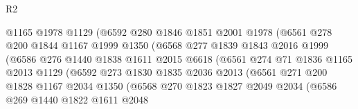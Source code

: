 \begin{lexlean}{R2}
\begin{coremodule}
                            @1165
                            @1978
                            @1129
                            (@6592
                              @280
                              @1846
                              @1851
                              @2001
                              @1978
                              (@6561
                                @278
                                @200
                                @1844
                                @1167
                                @1999
                                @1350
                                (@6568
                                  @277
                                  @1839
                                  @1843
                                  @2016
                                  @1999
                                  (@6586
                                    @276
                                    @1440
                                    @1838
                                    @1611
                                    @2015
                                    @6618
                                    (@6561
                                      @274
                                      @71
                                      @1836
                                      @1165
                                      @2013
                                      @1129
                                      (@6592
                                        @273
                                        @1830
                                        @1835
                                        @2036
                                        @2013
                                        (@6561
                                          @271
                                          @200
                                          @1828
                                          @1167
                                          @2034
                                          @1350
                                          (@6568
                                            @270
                                            @1823
                                            @1827
                                            @2049
                                            @2034
                                            (@6586
                                              @269
                                              @1440
                                              @1822
                                              @1611
                                              @2048

\end{coremodule}
\end{lexlean}
